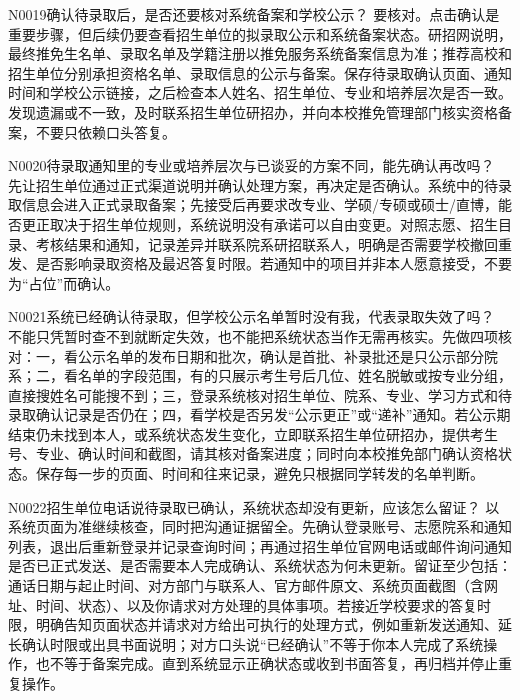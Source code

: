 \begin{qa}{N0019}{确认待录取后，是否还要核对系统备案和学校公示？}
要核对。点击确认是重要步骤，但后续仍要查看招生单位的拟录取公示和系统备案状态。研招网说明，最终推免生名单、录取名单及学籍注册以推免服务系统备案信息为准；推荐高校和招生单位分别承担资格名单、录取信息的公示与备案。保存待录取确认页面、通知时间和学校公示链接，之后检查本人姓名、招生单位、专业和培养层次是否一致。发现遗漏或不一致，及时联系招生单位研招办，并向本校推免管理部门核实资格备案，不要只依赖口头答复。
\end{qa}

\begin{qa}{N0020}{待录取通知里的专业或培养层次与已谈妥的方案不同，能先确认再改吗？}
先让招生单位通过正式渠道说明并确认处理方案，再决定是否确认。系统中的待录取信息会进入正式录取备案；先接受后再要求改专业、学硕/专硕或硕士/直博，能否更正取决于招生单位规则，系统说明没有承诺可以自由变更。对照志愿、招生目录、考核结果和通知，记录差异并联系院系研招联系人，明确是否需要学校撤回重发、是否影响录取资格及最迟答复时限。若通知中的项目并非本人愿意接受，不要为“占位”而确认。
\end{qa}

\begin{qa}{N0021}{系统已经确认待录取，但学校公示名单暂时没有我，代表录取失效了吗？}
不能只凭暂时查不到就断定失效，也不能把系统状态当作无需再核实。先做四项核对：一，看公示名单的发布日期和批次，确认是首批、补录批还是只公示部分院系；二，看名单的字段范围，有的只展示考生号后几位、姓名脱敏或按专业分组，直接搜姓名可能搜不到；三，登录系统核对招生单位、院系、专业、学习方式和待录取确认记录是否仍在；四，看学校是否另发“公示更正”或“递补”通知。若公示期结束仍未找到本人，或系统状态发生变化，立即联系招生单位研招办，提供考生号、专业、确认时间和截图，请其核对备案进度；同时向本校推免部门确认资格状态。保存每一步的页面、时间和往来记录，避免只根据同学转发的名单判断。
\end{qa}

\begin{qa}{N0022}{招生单位电话说待录取已确认，系统状态却没有更新，应该怎么留证？}
以系统页面为准继续核查，同时把沟通证据留全。先确认登录账号、志愿院系和通知列表，退出后重新登录并记录查询时间；再通过招生单位官网电话或邮件询问通知是否已正式发送、是否需要本人完成确认、系统状态为何未更新。留证至少包括：通话日期与起止时间、对方部门与联系人、官方邮件原文、系统页面截图（含网址、时间、状态）、以及你请求对方处理的具体事项。若接近学校要求的答复时限，明确告知页面状态并请求对方给出可执行的处理方式，例如重新发送通知、延长确认时限或出具书面说明；对方口头说“已经确认”不等于你本人完成了系统操作，也不等于备案完成。直到系统显示正确状态或收到书面答复，再归档并停止重复操作。
\end{qa}

